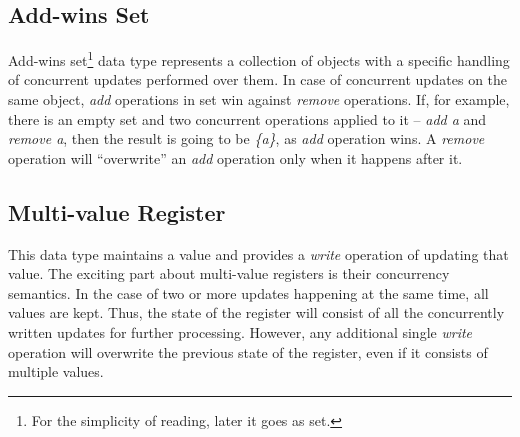 \subsection*{Add-wins Set}

Add-wins set\footnote{For the simplicity of reading, later it goes as set.} data type represents a collection of objects with a specific handling of concurrent updates performed over them. In case of concurrent updates on the same object, \textit{add} operations in set win against \textit{remove} operations. If, for example, there is an empty set \textit{} and two concurrent operations applied to it -- \textit{add a} and \textit{remove a}, then the result is going to be \textit{\{a\}}, as \textit{add} operation wins. A \textit{remove} operation will ``overwrite'' an \textit{add} operation only when it happens after it\cite{3}. 

\subsection*{Multi-value Register}

This data type maintains a value and provides a \textit{write} operation of updating that value. The exciting part about multi-value registers is their concurrency semantics. In the case of two or more updates happening at the same time, all values are kept. Thus, the state of the register will consist of all the concurrently written updates for further processing. However, any additional single \textit{write} operation will overwrite the previous state of the register, even if it consists of multiple values\cite{39}.